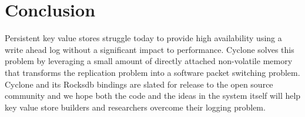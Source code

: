\documentclass[10pt, preprint, nonatbib]{sigplanconf}
\begin{document}
\section{Conclusion}
Persistent key value stores struggle today to provide high availability using a
write ahead log without a significant impact to performance. Cyclone solves this
problem by leveraging a small amount of directly attached non-volatile memory
that transforms the replication problem into a software packet switching
problem. Cyclone and its Rocksdb bindings are slated for release to the open
source community and we hope both the code and the ideas in the system itself
will help key value store builders and researchers overcome their logging
problem.
\newcommand\myurl[2]{\url{#1}}


\end{document}
